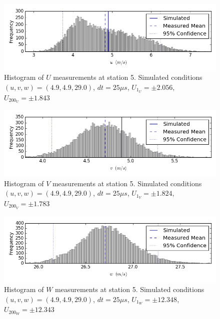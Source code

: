 \begin{figure}[H]
\centering
\includegraphics[width=6in]{figs/Ely_May28th05001/uncertainty_Ely_May28th05001_U}
\caption{Histogram of $U$ measurements at station 5. Simulated conditions $(u,v,w)=(4.9, 4.9, 29.0)$, $dt=25 \mu s$, $U_{1_{U}}=\pm 2.056$, $U_{200_{U}}=\pm 1.843$}
\label{fig:uncertainty_Ely_May28th05001_U}
\end{figure}


\begin{figure}[H]
\centering
\includegraphics[width=6in]{figs/Ely_May28th05001/uncertainty_Ely_May28th05001_V}
\caption{Histogram of $V$ measurements at station 5. Simulated conditions $(u,v,w)=(4.9, 4.9, 29.0)$, $dt=25 \mu s$, $U_{1_{V}}=\pm 1.824$, $U_{200_{V}}=\pm 1.783$}
\label{fig:uncertainty_Ely_May28th05001_V}
\end{figure}


\begin{figure}[H]
\centering
\includegraphics[width=6in]{figs/Ely_May28th05001/uncertainty_Ely_May28th05001_W}
\caption{Histogram of $W$ measurements at station 5. Simulated conditions $(u,v,w)=(4.9, 4.9, 29.0)$, $dt=25 \mu s$, $U_{1_{W}}=\pm 12.348$, $U_{200_{W}}=\pm 12.343$}
\label{fig:uncertainty_Ely_May28th05001_W}
\end{figure}



